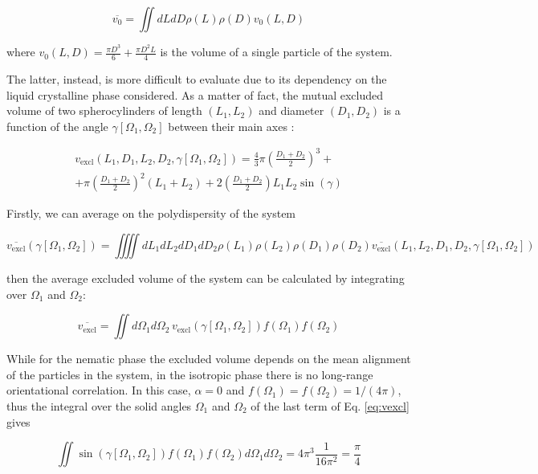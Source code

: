 \documentclass[journal=jacsat,manuscript=article]{achemso}
\begin{document}
\begin{equation}
	\overline{v_0} = \iint dL dD \rho(L) \rho(D) v_0(L, D)
\end{equation}

where $v_0(L, D) = \frac{\pi D^3}{6} + \frac{\pi D^2 L}{4}$ is the volume of a single particle of the system.

The latter, instead, is more difficult to evaluate due to its dependency on the liquid crystalline phase considered. As a matter of fact, the mutual excluded volume of two spherocylinders of length $(L_1, L_2)$ and diameter $(D_1, D_2)$ is a function of the angle $\gamma[\Omega_1, \Omega_2]$ between their main axes \cite{onsager1949effects}:



\begin{multline} \label{eq:vexcl}
	v_\mathrm{excl}(L_1, D_1, L_2, D_2, \gamma[\Omega_1, \Omega_2]) = \frac{4}{3} \pi \left(\frac{D_1 + D_2}{2}\right)^3 + \\ + \pi \left(\frac{D_1 + D_2}{2}\right)^2 (L_1 + L_2) + 2 \left( \frac{D_1 + D_2}{2} \right) L_1 L_2 \sin(\gamma)
\end{multline}

Firstly, we can average on the polydispersity of the system

 \begin{equation}
 	\overline{v_\mathrm{excl}}(\gamma[\Omega_1, \Omega_2]) = \iiiint dL_1 dL_2 dD_1 dD_2 \rho(L_1) \rho(L_2) \rho(D_1) \rho(D_2) \overline{v_\mathrm{excl}}(L_1, L_2, D_1, D_2, \gamma[\Omega_1, \Omega_2])
 \end{equation}

then the average excluded volume of the system can be calculated by integrating over $\Omega_1$ and $\Omega_2$:

\begin{equation}
	\overline{v_\mathrm{excl}}  = \iint d\Omega_1 d\Omega_2 \, v_\mathrm{excl}(\gamma[\Omega_1, \Omega_2]) f(\Omega_1)f(\Omega_2)  
\end{equation}

While for the nematic phase the excluded volume depends on the mean alignment of the particles in the system, in the isotropic phase there is no long-range orientational correlation. In this case, $\alpha = 0$ and $f(\Omega_1) = f(\Omega_2) = 1 / (4 \pi)$, thus the integral over the solid angles $\Omega_1$ and $\Omega_2$ of the last term of Eq. \ref{eq:vexcl} gives

\begin{equation}
	\iint \sin{\left(\gamma[\Omega_1, \Omega_2]\right) f(\Omega_1) f(\Omega_2) d\Omega_1 d\Omega_2 =4 \pi^3} \frac{1}{16 \pi^2} = \frac{\pi}{4}
\end{equation}
\end{document}
